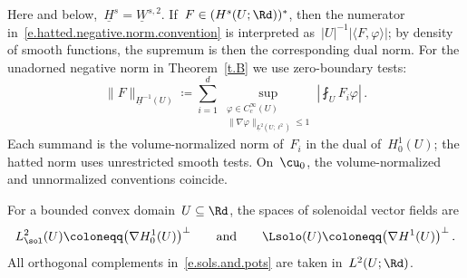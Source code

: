 \documentclass[11pt]{amsart}
\begin{document}
Here and below,~$\underline H^s=\underline W^{s,2}$.  If~$F\in(H^s(U;\Rd))^*$, then the numerator in~\eqref{e.hatted.negative.norm.convention} is interpreted as~$|U|^{-1}|\langle F,\varphi\rangle|$; by density of smooth functions, the supremum is then the corresponding dual norm. For the unadorned negative norm in Theorem~\ref{t.B} we use zero-boundary tests:
\begin{equation}
	\|F\|_{\underline H^{-1}(U)}
	\coloneqq
	\sum_{i=1}^d
	\sup_{\substack{\varphi\in C_c^\infty(U)\\ \|\nabla\varphi\|_{\underline L^2(U;\ell^2)}\leq1}}
	\left|\fint_U F_i\varphi\right|\,.
	\label{e.ordinary.negative.norm.convention}
\end{equation}
Each summand is the volume-normalized norm of~$F_i$ in the dual of~$H^1_0(U)$; the hatted norm uses unrestricted smooth tests. On~$\cu_0$, the volume-normalized and unnormalized conventions coincide.

\smallskip

For a bounded convex domain~$U\subseteq\Rd$, the spaces of solenoidal vector fields are
\begin{equation}
	L^2_{\sol}(U)\coloneqq\bigl(\nabla H^1_0(U)\bigr)^\perp
	\qquad\text{and}\qquad
	\Lsolo(U)\coloneqq\bigl(\nabla H^1(U)\bigr)^\perp\,.
	\label{e.sols.and.pots}
\end{equation}
All orthogonal complements in~\eqref{e.sols.and.pots} are taken in~$L^2(U;\Rd)$.
\end{document}
